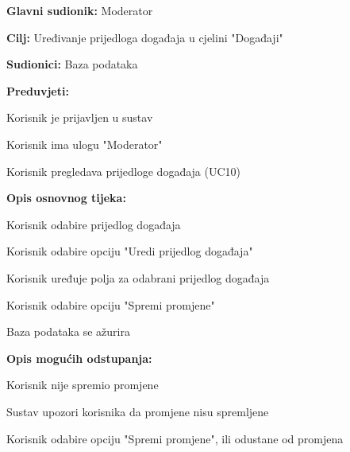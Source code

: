 						\noindent {}
					\begin{packed_item}
	
						\item \textbf{Glavni sudionik: }Moderator
						\item  \textbf{Cilj:} Uređivanje prijedloga događaja u cjelini "Događaji"
						\item  \textbf{Sudionici:} Baza podataka
						\item  \textbf{Preduvjeti:}
						\item[] \begin{packed_enum}
							\item Korisnik je prijavljen u sustav
							\item Korisnik ima ulogu "Moderator"
							\item Korisnik pregledava prijedloge događaja (UC10)
						\end{packed_enum}
						\item  \textbf{Opis osnovnog tijeka:}
						
						\item[] \begin{packed_enum}
	
							\item Korisnik odabire prijedlog događaja 
							\item Korisnik odabire opciju "Uredi prijedlog događaja"
							\item Korisnik uređuje polja za odabrani prijedlog događaja
							\item Korisnik odabire opciju "Spremi promjene"
							\item Baza podataka se ažurira
							
						\end{packed_enum}
						\item  \textbf{Opis mogućih odstupanja:}
						
						\item[] \begin{packed_item}
	
							\item[4.a] Korisnik nije spremio promjene
							\item[] \begin{packed_enum}
								
								\item Sustav upozori korisnika da promjene nisu spremljene
								\item Korisnik odabire opciju "Spremi promjene", ili odustane od promjena
								

\end{packed_enum}
\end{packed_item}
\end{packed_item}
